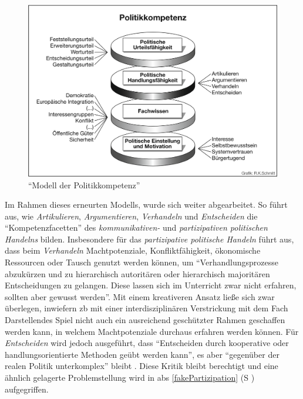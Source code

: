 \begin{figure}[htb]
    \centering
    \includegraphics[width=1\linewidth]{Detjen et al. 2012 p. 15.png}
    \caption{\enquote{Modell der Politikkompetenz} \autocite[15]{Detjen.2012}}
    \label{2012kompMod}
\end{figure}

Im Rahmen dieses erneurten Modells, wurde sich weiter abgearbeitet. So führt \textcite[27]{Massing2012} aus, wie \emph{Artikulieren}, \emph{Argumentieren}, \emph{Verhandeln} und \emph{Entscheiden} die \enquote{Kompetenzfacetten} des \emph{kommunikativen-} und \emph{partizipativen politischen Handelns} bilden. 
Insbesondere für das \emph{partizipative politische Handeln} führt \textcite[27]{Massing2012} aus, dass beim \emph{Verhandeln} Machtpotenziale, Konfliktfähigkeit, ökonomische Ressourcen oder Tausch genutzt werden können, um \enquote{Verhandlungsprozesse abzukürzen und zu hierarchisch autoritären oder hierarchisch majoritären Entscheidungen zu gelangen. Diese lassen sich im Unterricht zwar nicht erfahren, sollten aber gewusst werden}. 
Mit einem kreativeren Ansatz ließe sich zwar überlegen, inwiefern \gls{zb} mit einer interdisziplinären Verstrickung mit dem Fach Darstellendes Spiel nicht auch ein ausreichend geschützter Rahmen geschaffen werden kann, in welchem Machtpotenziale durchaus erfahren werden können. Für \emph{Entscheiden} wird jedoch ausgeführt, dass \enquote{Entscheiden durch kooperative oder handlungsorientierte Methoden geübt werden kann}, es aber \enquote{gegenüber der realen Politik unterkomplex} bleibt \autocite[27]{Massing2012}. Diese Kritik bleibt berechtigt und eine ähnlich gelagerte Problemstellung wird in \gls{abs} \ref{fakePartizipation} (\gls{S} \pageref{fakePartizipation}) aufgegriffen. 


